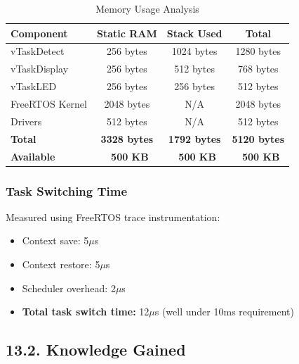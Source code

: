 \documentclass[12pt]{article}
\begin{document}
\begin{table}[H]
    \centering
    \caption{Memory Usage Analysis}
    \label{tab:memory-usage}
    \begin{tabular}{|l|c|c|c|}
        \hline
        \textbf{Component} & \textbf{Static RAM} & \textbf{Stack Used} & \textbf{Total} \\
        \hline
        vTaskDetect & 256 bytes & 1024 bytes & 1280 bytes \\
        \hline
        vTaskDisplay & 256 bytes & 512 bytes & 768 bytes \\
        \hline
        vTaskLED & 256 bytes & 256 bytes & 512 bytes \\
        \hline
        FreeRTOS Kernel & 2048 bytes & N/A & 2048 bytes \\
        \hline
        Drivers & 512 bytes & N/A & 512 bytes \\
        \hline
        \textbf{Total} & \textbf{3328 bytes} & \textbf{1792 bytes} & \textbf{5120 bytes} \\
        \hline
        \textbf{Available} & \textbf{~500 KB} & \textbf{~500 KB} & \textbf{~500 KB} \\
        \hline
    \end{tabular}
\end{table}

\subsubsection*{Task Switching Time}

Measured using FreeRTOS trace instrumentation:

\begin{itemize}
    \item Context save: 5$\mu$s
    \item Context restore: 5$\mu$s
    \item Scheduler overhead: 2$\mu$s
    \item \textbf{Total task switch time:} 12$\mu$s (well under 10ms requirement)
\end{itemize}



\subsection*{13.2. Knowledge Gained}
\end{document}
